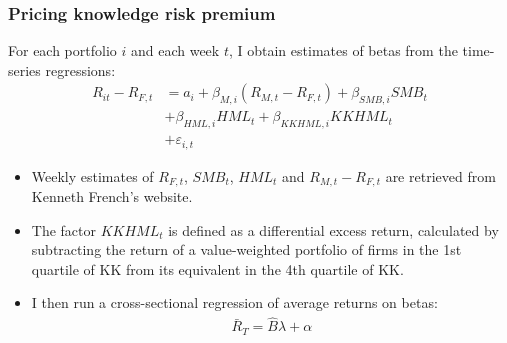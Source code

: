 \documentclass{beamer}
\newcommand{\ffo}{dicfullmc10thr10defnob40noa1_4t}
\begin{document}
\begin{frame}
\frametitle{Pricing knowledge risk premium}
For each portfolio $i$ and each week $t$, I obtain estimates of betas from the time-series regressions:
	\begin{align*}
		R_{it}-R_{F,t} &= a_i + \beta_{M, i} (R_{M,t}-R_{F,t}) + \beta_{SMB, i} SMB_t \\
		&+\beta_{HML, i} HML_t +\beta_{KKHML, i} KKHML_t \\
		&+\varepsilon_{i,t} 
	\end{align*}
\begin{itemize}
	\item Weekly estimates of $R_{F,t}$, $SMB_t$, $HML_t$ and $R_{M,t}-R_{F,t}$ are retrieved from Kenneth French's website. 
\end{itemize}
\end{frame}

\begin{frame}
\begin{itemize}
	\item The factor $KKHML_t$ is defined as a differential excess return, calculated by subtracting the return of a value-weighted portfolio of firms in the 1st quartile of KK from its equivalent in the 4th quartile of KK.
	\item I then run a cross-sectional regression of average returns on betas:
\begin{align}
\bar{R}_T=\widehat{B} \lambda+\alpha
\end{align}
\end{itemize}

\end{frame}


\begin{frame}
\tiny

\end{frame}
\end{document}
